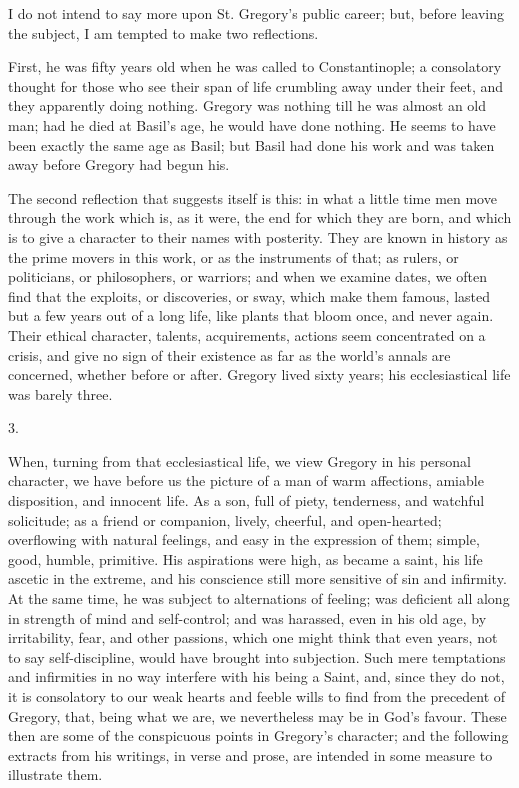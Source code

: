 I do not intend to say more upon St. Gregory's public career; but,
before leaving the subject, I am tempted to make two reflections.

First, he was fifty years old when he was called to Constantinople;
a consolatory thought for those who see their span of life crumbling
away under their feet, and they apparently doing nothing. Gregory was
nothing till he was almost an old man; had he died at Basil's age, he
would have done nothing. He seems to have been exactly the same
age as Basil; but Basil had done his work and was taken away before
Gregory had begun his.

The second reflection that suggests itself is this: in what a
little time men move through the work which is, as it were, the end
for which they are born, and which is to give a character to their
names with posterity. They are known in history as the prime movers in
this work, or as the instruments of that; as rulers, or politicians,
or philosophers, or warriors; and when we examine dates, we often find
that the exploits, or discoveries, or sway, which make them famous,
lasted but a few years out of a long life, like plants that bloom
once, and never again. Their ethical character, talents, acquirements,
actions seem concentrated on a crisis, and give no sign of their
existence as far as the world's annals are concerned, whether before
or after. Gregory lived sixty years; his ecclesiastical life was
barely three.

3.

When, turning from that ecclesiastical life, we view Gregory in his
personal character, we have before us the picture of a man of warm
affections, amiable disposition, and innocent life. As a son, full of
piety, tenderness, and watchful solicitude; as a friend or companion,
lively, cheerful, and open-hearted; overflowing with natural feelings,
and easy in the expression of them; simple, good, humble, primitive.
His aspirations were high, as became a saint, his life ascetic in the
extreme, and his conscience still more sensitive of sin and infirmity.
At the same time, he was subject to alternations of feeling; was
deficient all along in strength of mind and self-control; and was
harassed, even in his old age, by irritability, fear, and other
passions, which one might think that even years, not to say
self-discipline, would have brought into subjection. Such mere
temptations and infirmities in no way interfere with his being a
Saint, and, since they do not, it is consolatory to our weak hearts
and feeble wills to find from the precedent of Gregory, that, being
what we are, we nevertheless may be in God's favour. These then are
some of the conspicuous points in Gregory's character; and the
following extracts from his writings, in verse and prose, are intended
in some measure to illustrate them.

